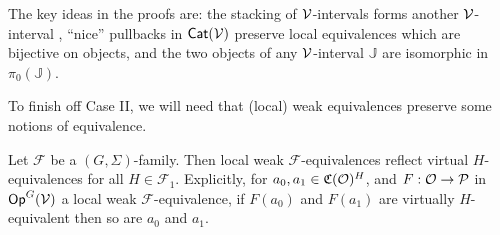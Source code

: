 \documentclass[a4paper,10pt
,draft
]{article}%
\renewcommand{\F}{\mathcal F}
\renewcommand{\1}{\eta}%
\begin{document}



The key ideas in the proofs are:
the stacking of $\mathcal V$-intervals forms another $\mathcal V$-interval ,
``nice'' pullbacks in $\mathsf{Cat}(\mathcal V)$ preserve local equivalences which are bijective on objects, and
the two objects of any $\mathcal V$-interval $\mathbb J$ are isomorphic in $\pi_0(\mathbb J)$.

To finish off Case II, we will need that (local) weak equivalences preserve some notions of equivalence.

\begin{lemma}
      \label{REF_VIRT_LEM}
      Let $\F$ be a $(G, \Sigma)$-family. %
      Then local weak $\F$-equivalences reflect virtual $H$-equivalences for all $H \in \F_1$.
      Explicitly, for
      $a_0,a_1 \in \mathfrak C(\mathcal{O})^H$, and $F: \mathcal{O} \to \mathcal{P}$ in $\mathsf{Op}^G(\mathcal V)$ a local weak $\F$-equivalence,
      if $F(a_0)$ and $F(a_1)$ are virtually $H$-equivalent then so are $a_0$ and $a_1$.
\end{lemma}
\end{document}
